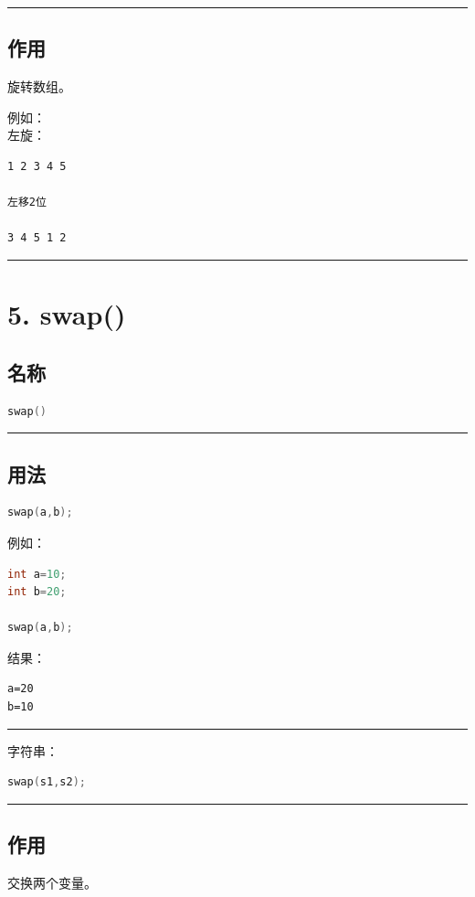 \documentclass[10pt,twocolumn]{extarticle}
\begin{document}
\noindent\rule{\linewidth}{0.4pt}

\subsection{作用}
旋转数组。

例如：\\
左旋：
\begin{lstlisting}
1 2 3 4 5

左移2位

3 4 5 1 2
\end{lstlisting}

\noindent\rule{\linewidth}{0.4pt}

\section{5. swap()}

\subsection{名称}
\begin{lstlisting}[language=C++]
swap()
\end{lstlisting}

\noindent\rule{\linewidth}{0.4pt}

\subsection{用法}
\begin{lstlisting}[language=C++]
swap(a,b);
\end{lstlisting}
例如：
\begin{lstlisting}[language=C++]
int a=10;
int b=20;

swap(a,b);
\end{lstlisting}
结果：
\begin{lstlisting}
a=20
b=10
\end{lstlisting}

\noindent\rule{\linewidth}{0.4pt}

字符串：
\begin{lstlisting}[language=C++]
swap(s1,s2);
\end{lstlisting}

\noindent\rule{\linewidth}{0.4pt}

\subsection{作用}
交换两个变量。
\end{document}
